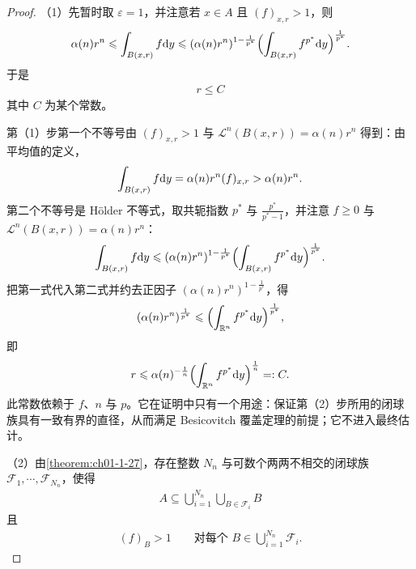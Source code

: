 \documentclass[../../main.tex]{subfiles}%
\begin{document}
\begin{proof}
（1）先暂时取 $\varepsilon=1$，并注意若 $x\in A$ 且 $(f)_{x,r}>1$，则
\begin{align*}
\alpha(n)r^n\leqslant\int_{B(x,r)}f\mathrm{d} y\leqslant(\alpha(n)r^n)^{1-\frac{1}{p^*}}\Bigl(\int_{B(x,r)}f^{p^*}\mathrm{d} y\Bigr)^{\frac{1}{p^*}} .
\end{align*}
于是
\begin{align*}
r\leqslant C
\end{align*}
其中 $C$ 为某个常数。

第（1）步第一个不等号由 $(f)_{x,r}>1$ 与 $\mathcal{L}^n(B(x,r))=\alpha(n)r^n$ 得到：由平均值的定义，
\begin{align*}
\int_{B(x,r)}f\mathrm{d} y=\alpha(n)r^n(f)_{x,r}>\alpha(n)r^n .
\end{align*}
第二个不等号是 Hölder 不等式，取共轭指数 $p^*$ 与 $\frac{p^*}{p^*-1}$，并注意 $f\geqslant0$ 与 $\mathcal{L}^n(B(x,r))=\alpha(n)r^n$：
\begin{align*}
\int_{B(x,r)}f\mathrm{d} y\leqslant(\alpha(n)r^n)^{1-\frac{1}{p^*}}\Bigl(\int_{B(x,r)}f^{p^*}\mathrm{d} y\Bigr)^{\frac{1}{p^*}} .
\end{align*}
把第一式代入第二式并约去正因子 $(\alpha(n)r^n)^{1-\frac{1}{p^*}}$，得
\begin{align*}
(\alpha(n)r^n)^{\frac{1}{p^*}}\leqslant\Bigl(\int_{\mathbb{R}^n}f^{p^*}\mathrm{d} y\Bigr)^{\frac{1}{p^*}} ,
\end{align*}
即
\begin{align*}
r\leqslant\alpha(n)^{-\frac{1}{n}}\Bigl(\int_{\mathbb{R}^n}f^{p^*}\mathrm{d} y\Bigr)^{\frac{1}{n}}=:C .
\end{align*}
此常数依赖于 $f$、$n$ 与 $p$。它在证明中只有一个用途：保证第（2）步所用的闭球族具有一致有界的直径，从而满足 Besicovitch 覆盖定理的前提；它不进入最终估计。

（2）由\cref{theorem:ch01-1-27}，存在整数 $N_n$ 与可数个两两不相交的闭球族 $\mathcal{F}_1,\cdots,\mathcal{F}_{N_n}$，使得%
\begin{align*}
A\subseteq\bigcup_{i=1}^{N_n}\bigcup_{B\in\mathcal{F}_i}B
\end{align*}
且
\begin{align*}
(f)_B>1\qquad\text{对每个 }B\in\bigcup_{i=1}^{N_n}\mathcal{F}_i .
\end{align*}


\end{proof}
\end{document}
